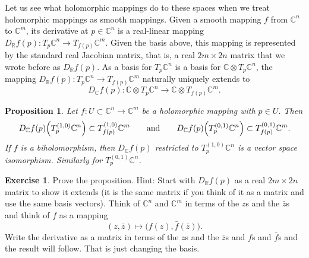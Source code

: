 \documentclass[12pt,openany]{book}
\newcommand{\C}{{\mathbb{C}}}
\newcommand{\R}{{\mathbb{R}}}
\theoremstyle{plain}
\newtheorem{prop}[thm]{Proposition}
\theoremstyle{remark}
\theoremstyle{definition}
\newenvironment{exbox}{%
    \def\FrameCommand{\vrule width 1pt \relax\hspace{10pt}}%
    \MakeFramed{\advance\hsize-\width\FrameRestore}%
}{%
    \endMakeFramed
}
\theoremstyle{exercise}
\newtheorem{exercise}{Exercise}[section]
\theoremstyle{example}
\begin{document}
Let us see what holomorphic mappings do to these spaces when we treat
holomorphic mappings as smooth mappings.
Given a smooth
mapping $f$ from $\C^n$ to $\C^m$, its derivative at $p \in \C^n$
is a real-linear mapping $D_\R f(p) \colon T_p\C^n \to T_{f(p)} \C^m$.
Given the basis above, this mapping is represented by
the standard real Jacobian matrix, that is, a real $2m \times 2n$ matrix
that we wrote before as $D_\R f(p)$.
As a basis for $T_p\C^n$ is a basis for $\C \otimes T_p \C^n$, the mapping
$D_\R f(p) \colon T_p\C^n \to T_{f(p)} \C^m$ naturally uniquely
extends to
%
\begin{equation*}
D_\C f(p) \colon \C \otimes T_p\C^n \to \C \otimes T_{f(p)} \C^m .
\end{equation*}

\begin{prop} \label{prop:holvectmap}
Let $f \colon U \subset \C^n \to \C^m$ be a holomorphic mapping with
$p \in U$.
Then
\begin{equation*}
D_\C f(p)\Bigl(T_p^{(1,0)} \C^n\Bigr) \subset T_{f(p)}^{(1,0)} \C^m
\qquad \text{and} \qquad
D_\C f(p)\Bigl(T_p^{(0,1)} \C^n\Bigr) \subset T_{f(p)}^{(0,1)} \C^m .
\end{equation*}
If $f$ is a biholomorphism, then $D_\C f(p)$ restricted to $T_p^{(1,0)} \C^n$
is a vector space isomorphism.  Similarly for $T_p^{(0,1)} \C^n$.
\end{prop}

\begin{exbox}
\begin{exercise}
Prove the proposition.
Hint: Start with $D_\R f(p)$ as a real $2m \times 2n$ matrix to show it
extends (it is the same matrix if you think of it as a matrix
and use the same basis vectors).
Think of $\C^n$ and $\C^m$ in terms of the $z$s and the
$\bar{z}$s and think of $f$ as a mapping
\begin{equation*}
(z,\bar{z}) \mapsto \bigl( f(z) , \bar{f}(\bar{z}) \bigr) .
\end{equation*}
Write the derivative as a matrix in terms of the $z$s and the $\bar{z}$s
and $f$s and $\bar{f}$s and the result will follow.  That is just changing
the basis.
\end{exercise}
\end{exbox}
\end{document}
